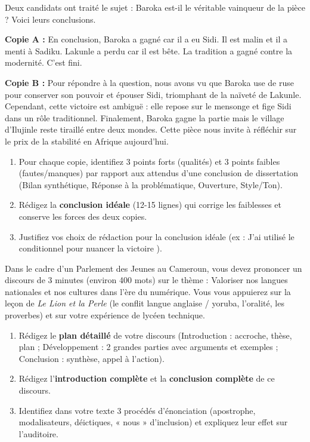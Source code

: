 \documentclass[11pt]{article}
\begin{document}
\begin{exercice}
Deux candidats ont traité le sujet : \og Baroka est-il le véritable vainqueur de la pièce ? \fg Voici leurs conclusions.

\textbf{Copie A :}
\og En conclusion, Baroka a gagné car il a eu Sidi. Il est malin et il a menti à Sadiku. Lakunle a perdu car il est bête. La tradition a gagné contre la modernité. C'est fini. \fg

\textbf{Copie B :}
\og Pour répondre à la question, nous avons vu que Baroka use de ruse pour conserver son pouvoir et épouser Sidi, triomphant de la naïveté de Lakunle. Cependant, cette victoire est ambiguë : elle repose sur le mensonge et fige Sidi dans un rôle traditionnel. Finalement, Baroka gagne la partie mais le village d'Ilujinle reste tiraillé entre deux mondes. Cette pièce nous invite à réfléchir sur le prix de la stabilité en Afrique aujourd'hui. \fg

\begin{enumerate}
\item Pour chaque copie, identifiez 3 points forts (qualités) et 3 points faibles (fautes/manques) par rapport aux attendus d'une conclusion de dissertation (Bilan synthétique, Réponse à la problématique, Ouverture, Style/Ton).
\item Rédigez la \textbf{conclusion idéale} (12-15 lignes) qui corrige les faiblesses et conserve les forces des deux copies.
\item Justifiez vos choix de rédaction pour la conclusion idéale (ex : \og J'ai utilisé le conditionnel pour nuancer la victoire \fg).
\end{enumerate}
\end{exercice}

\begin{exercice}
Dans le cadre d'un \og Parlement des Jeunes \fg au Cameroun, vous devez prononcer un discours de 3 minutes (environ 400 mots) sur le thème : \og Valoriser nos langues nationales et nos cultures dans l'ère du numérique. \fg
Vous vous appuierez sur la leçon de \emph{Le Lion et la Perle} (le conflit langue anglaise / yoruba, l'oralité, les proverbes) et sur votre expérience de lycéen technique.
\begin{enumerate}
\item Rédigez le \textbf{plan détaillé} de votre discours (Introduction : accroche, thèse, plan ; Développement : 2 grandes parties avec arguments et exemples ; Conclusion : synthèse, appel à l'action).
\item Rédigez l'\textbf{introduction complète} et la \textbf{conclusion complète} de ce discours.
\item Identifiez dans votre texte 3 procédés d'énonciation (apostrophe, modalisateurs, déictiques, « nous » d'inclusion) et expliquez leur effet sur l'auditoire.
\end{enumerate}
\end{exercice}
\end{document}
